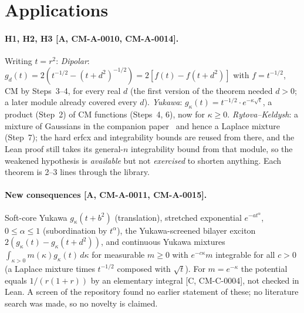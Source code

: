 \documentclass[10pt]{article}
\theoremstyle{remark}
\newcommand{\tier}[1]{\textsf{[#1]}}
\newcommand{\lean}[1]{\texttt{\detokenize{#1}}}
\newcommand{\CM}{\mathrm{CM}}
\begin{document}
\section{Applications}\label{sec:app}



\paragraph{H1, H2, H3 \tier{A, CM-A-0010, CM-A-0014}.} Writing $t=r^2$:
\emph{Dipolar}: $g_d(t)=2(t^{-1/2}-(t+d^2)^{-1/2})=2[f(t)-f(t+d^2)]$ with $f=t^{-1/2}$, $\CM$ by Steps~3--4, for every
real $d$ (the first version of the theorem needed $d>0$; a later module already covered every $d$). \emph{Yukawa}: $g_\kappa(t)=t^{-1/2}\cdot e^{-\kappa\sqrt t}$, a product (Step~2)
of $\CM$ functions (Steps~4, 6), now for $\kappa\ge0$. \emph{Rytova--Keldysh}: a mixture of Gaussians in the companion
paper~\cite{kel} and hence a Laplace mixture (Step~7); the hard erfcx and integrability bounds are reused from there,
and the Lean proof still takes its general-$n$ integrability bound from that module, so the weakened hypothesis is
\emph{available} but not \emph{exercised} to shorten anything. Each theorem is 2--3 lines through the library.

\paragraph{New consequences \tier{A, CM-A-0011, CM-A-0015}.} Soft-core Yukawa $g_\kappa(t+b^2)$ (translation),
stretched exponential $e^{-at^\alpha}$, $0\le\alpha\le1$ (subordination by $t^\alpha$), the Yukawa-screened bilayer
exciton $2(g_\kappa(t)-g_\kappa(t+d^2))$, and continuous Yukawa mixtures $\int_{\kappa>0}m(\kappa)g_\kappa(t)\,d\kappa$ for
measurable $m\ge0$ with $e^{-c\kappa}m$ integrable for all $c>0$ (a Laplace mixture times $t^{-1/2}$ composed with $\sqrt t$).
For $m=e^{-\kappa}$ the potential equals $1/(r(1+r))$ by an elementary integral \tier{C, CM-C-0004}, not checked in Lean.
A screen of the repository found no earlier statement of these; no literature search was made, so no novelty is
claimed.


\end{document}

